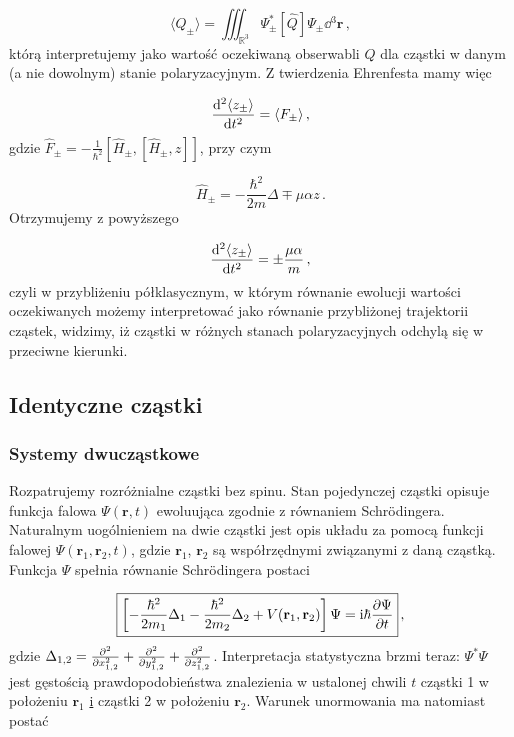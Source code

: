 \documentclass{myclass}
\begin{document}
\begin{equation*}
\langle Q_\pm\rangle=\iiint_{\mathbb{R}^3}\Psi_\pm^*[\hat{Q}]\Psi_\pm\dd{^3\mathbf{r}}\,,
\end{equation*}
którą interpretujemy jako wartość oczekiwaną obserwabli \(Q\) dla cząstki w danym (a nie dowolnym)
stanie polaryzacyjnym. Z twierdzenia Ehrenfesta mamy więc

\begin{equation*}
\dv[2]{\langle z_\pm\rangle}{t}=\langle F_\pm\rangle\,,
\end{equation*}
gdzie \(\hat{F}_\pm=-\frac{1}{\hbar^2}\left[\hat{H}_\pm,[\hat{H}_\pm,z]\right]\), przy czym

\begin{equation*}
\hat{H}_\pm=-\frac{\hbar^2}{2m}\Delta\mp\mu\alpha z\,.
\end{equation*}
Otrzymujemy z powyższego

\begin{equation*}
\dv[2]{\langle z_\pm\rangle}{t}=\pm\frac{\mu\alpha}{m}\,,
\end{equation*}
czyli w przybliżeniu półklasycznym, w którym równanie ewolucji wartości oczekiwanych możemy
interpretować jako równanie przybliżonej trajektorii cząstek, widzimy, iż cząstki w różnych stanach
polaryzacyjnych odchylą się w przeciwne kierunki.

\subsection{Identyczne cząstki}

\subsubsection{Systemy dwucząstkowe}

Rozpatrujemy rozróżnialne cząstki bez spinu. Stan pojedynczej cząstki opisuje funkcja falowa
\(\Psi(\mathbf{r},t)\) ewoluująca zgodnie z równaniem Schr{\"o}dingera. Naturalnym uogólnieniem na
dwie cząstki jest opis układu za pomocą funkcji falowej \(\Psi(\mathbf{r}_1,\mathbf{r}_2,t)\), gdzie
\(\mathbf{r}_1\), \(\mathbf{r}_2\) są współrzędnymi związanymi z daną cząstką. Funkcja \(\Psi\)
spełnia równanie Schr{\"o}dingera postaci

\begin{equation*}
\boxed{\left[-\frac{\hbar^2}{2m_1}\Delta_1-\frac{\hbar^2}{2m_2}\Delta_2+V(\mathbf{r}_1,\mathbf{r}_2)\right]\Psi=\mathrm{i}\hbar\pdv{\Psi}{t}}\,,
\end{equation*}
gdzie \(\Delta_{1,2}=\pdv[2]{ }{x_{1,2}}+\pdv[2]{ }{y_{1,2}}+\pdv[2]{ }{z_{1,2}}\). Interpretacja
statystyczna brzmi teraz: \(\Psi^*\Psi\) jest gęstością prawdopodobieństwa znalezienia w ustalonej
chwili \(t\) cząstki 1 w położeniu \(\mathbf{r}_1\) \underline{i} cząstki 2 w położeniu
\(\mathbf{r}_2\). Warunek unormowania ma natomiast postać
\end{document}
